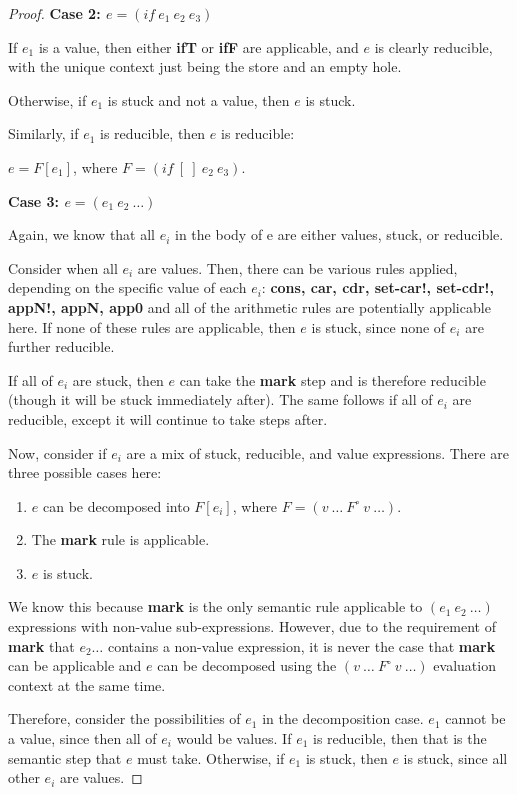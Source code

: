 \begin{proof}
\textbf{Case 2: $e = (if\ e_1\ e_2\ e_3)$}

If $e_1$ is a value, then either \textbf{ifT} or \textbf{ifF} are applicable, and $e$ is clearly reducible, with the unique context just being the store and an empty hole.

Otherwise, if $e_1$ is stuck and not a value, then $e$ is stuck. 

Similarly, if $e_1$ is reducible, then $e$ is reducible:

$e = F[e_1]$, where $F = (if\ [\ ]\ e_2\ e_3)$.

\textbf{Case 3: $e = (e_1\ e_2\ \dots)$}

Again, we know that all $e_i$ in the body of e are either values, stuck, or reducible.

Consider when all $e_i$ are values. Then, there can be various rules applied, depending on the specific value of each $e_i$: \textbf{cons, car, cdr, set-car!, set-cdr!, appN!, appN, app0} and all of the arithmetic rules are potentially applicable here. If none of these rules are applicable, then $e$ is stuck, since none of $e_i$ are further reducible.

If all of $e_i$ are stuck, then $e$ can take the \textbf{mark} step and is therefore reducible (though it will be stuck immediately after). The same follows if all of $e_i$ are reducible, except it will continue to take steps after.

Now, consider if $e_i$ are a mix of stuck, reducible, and value expressions. There are three possible cases here:

\begin{enumerate}
    \item $e$ can be decomposed into $F[e_i]$, where $F = (v\ \dots\ F^{\circ}\ v\ \dots)$.
    \item The \textbf{mark} rule is applicable.
    \item $e$ is stuck.
\end{enumerate}

We know this because \textbf{mark} is the only semantic rule applicable to $(e_1\ e_2\ \dots)$ expressions with non-value sub-expressions. However, due to the requirement of \textbf{mark} that $e_2\dots$ contains a non-value expression, it is never the case that \textbf{mark} can be applicable and $e$ can be decomposed using the $(v\ \dots\ F^{\circ}\ v\ \dots)$ evaluation context at the same time.

Therefore, consider the possibilities of $e_1$ in the decomposition case. $e_1$ cannot be a value, since then all of $e_i$ would be values. If $e_1$ is reducible, then that is the semantic step that $e$ must take. Otherwise, if $e_1$ is stuck, then $e$ is stuck, since all other $e_i$ are values.


\end{proof}
